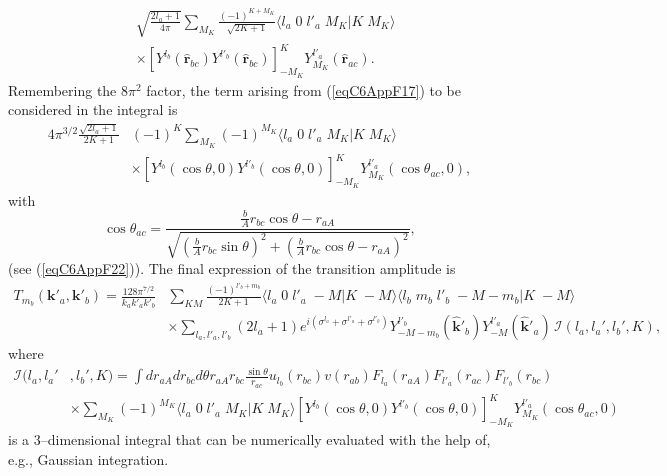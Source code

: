 \begin{subappendices}
\begin{equation}
\begin{split}
&\sqrt{\frac{2l_a+1}{4\pi}}\sum_{M_K}\frac{(-1)^{K+M_K}}{\sqrt{2K+1}} \langle l_a\;0\;l'_a\;M_K|K\;M_K\rangle\\
&\times \left[ Y^{l_b} (\hat{\mathbf r}_{bc}) Y^{l'_b} (\hat{\mathbf r}_{bc})\right]^{K}_{-M_K} Y^{l'_a}_{M_K} (\hat{ \mathbf r}_{ac}).
\end{split}
\end{equation}
Remembering the $8\pi^2$ factor, the term arising from (\ref{eqC6AppF17}) to be considered in the integral is
\begin{equation}\label{eqC6AppG24}
\begin{split}
4\pi^{3/2}\frac{\sqrt{2l_a+1}}{2K+1}&(-1)^K\sum_{M_K}(-1)^{M_K} \langle l_a\;0\;l'_a\;M_K|K\;M_K\rangle\\
&\times \left[ Y^{l_b} (\cos \theta,0) Y^{l'_b} (\cos \theta,0)\right]^{K}_{-M_K} Y^{l'_a}_{M_K} (\cos \theta_{ac},0),
\end{split}
\end{equation}
with
\begin{equation}\label{eqC6AppG25}
\cos \theta_{ac}=\frac{\frac{b}{A}r_{bc}\cos \theta-r_{aA}}{\sqrt{\left(\frac{b}{A}r_{bc}\sin \theta\right)^2+\left(\frac{b}{A}r_{bc}\cos \theta-r_{aA}\right)^2}},
\end{equation}
(see (\ref{eqC6AppF22})). The final expression of the transition amplitude is
\begin{equation}\label{eqC6AppG26}
\begin{split}
T_{m_b}(\mathbf{k}'_a,\mathbf{k}'_b)=\frac{128\pi^{7/2}}{k_ak'_ak'_b}&\sum_{KM}\frac{(-1)^{l'_b+m_b}}{2K+1}\langle l_a\;0\;l'_a\;-M|K\;-M\rangle\langle l_b\;m_b\;l'_b\;-M-m_b|K\;-M\rangle\\
&\times \sum_{l_a,l'_a,l'_b}(2l_a+1) e^{i(\sigma^{l_a}+\sigma^{l'_a}+\sigma^{l'_b})}Y^{l'_b}_{-M-m_b} (\hat{ \mathbf k}'_{b}) Y^{l'_a}_{-M} (\hat{ \mathbf k}'_{a})\,\mathcal I(l_a,l_a',l_b',K),
\end{split}
\end{equation}
where
\begin{equation}\label{eqC6AppG27}
\begin{split}
\mathcal I(l_a,l_a'&,l_b',K)=\int dr_{aA} dr_{bc}d\theta r_{aA}r_{bc} \frac{\sin \theta}{r_{ac}} u_{l_b}(r_{bc})v(r_{ab})F_{l_a}(r_{aA})  F_{l'_a}(r_{ac})F_{l'_b}(r_{bc}) \\
&\times \sum_{M_K} (-1)^{M_K}\langle l_a\;0\;l'_a\;M_K|K\;M_K\rangle \left[ Y^{l_b} (\cos \theta,0) Y^{l'_b} (\cos \theta,0)\right]^{K}_{-M_K} Y^{l'_a}_{M_K} (\cos \theta_{ac},0)
\end{split}
\end{equation}
is a 3--dimensional integral that can be numerically evaluated with the help of, e.g., Gaussian integration.

\end{subappendices}
